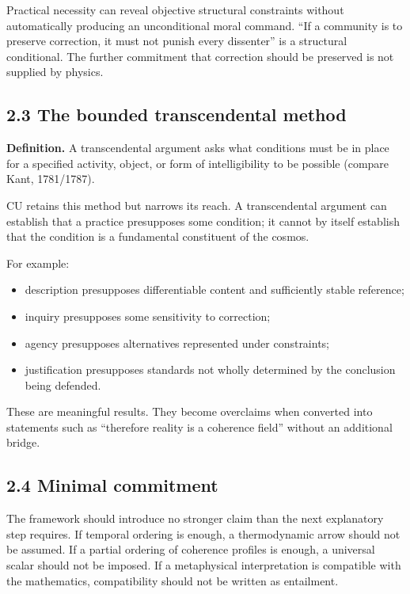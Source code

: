 \documentclass[
  11pt,
]{article}
\providecommand{\tightlist}{%
  \setlength{\itemsep}{0pt}\setlength{\parskip}{0pt}}
\begin{document}
Practical necessity can reveal objective structural constraints without
automatically producing an unconditional moral command. ``If a community
is to preserve correction, it must not punish every dissenter'' is a
structural conditional. The further commitment that correction should be
preserved is not supplied by physics.

\subsection{2.3 The bounded transcendental
method}\label{the-bounded-transcendental-method}

\textbf{Definition.} A transcendental argument asks what conditions must
be in place for a specified activity, object, or form of intelligibility
to be possible (compare Kant, 1781/1787).

CU retains this method but narrows its reach. A transcendental argument
can establish that a practice presupposes some condition; it cannot by
itself establish that the condition is a fundamental constituent of the
cosmos.

For example:

\begin{itemize}
\tightlist
\item
  description presupposes differentiable content and sufficiently stable
  reference;
\item
  inquiry presupposes some sensitivity to correction;
\item
  agency presupposes alternatives represented under constraints;
\item
  justification presupposes standards not wholly determined by the
  conclusion being defended.
\end{itemize}

These are meaningful results. They become overclaims when converted into
statements such as ``therefore reality is a coherence field'' without an
additional bridge.

\subsection{2.4 Minimal commitment}\label{minimal-commitment}

The framework should introduce no stronger claim than the next
explanatory step requires. If temporal ordering is enough, a
thermodynamic arrow should not be assumed. If a partial ordering of
coherence profiles is enough, a universal scalar should not be imposed.
If a metaphysical interpretation is compatible with the mathematics,
compatibility should not be written as entailment.
\end{document}
